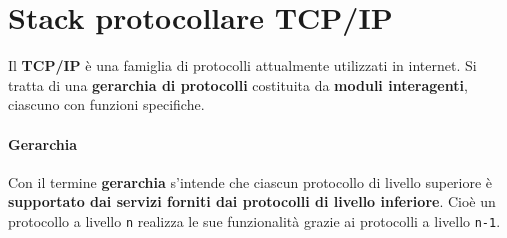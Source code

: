 \documentclass[10pt]{article}
\begin{document}
\section{Stack protocollare TCP/IP}
Il \textbf{TCP/IP} è una famiglia di protocolli attualmente utilizzati in internet. Si tratta di una \textbf{gerarchia di protocolli} costituita da \textbf{moduli interagenti}, ciascuno con funzioni specifiche.
\paragraph{Gerarchia} Con il termine \textbf{gerarchia} s'intende che ciascun protocollo di livello superiore è \textbf{supportato dai servizi forniti dai protocolli di livello inferiore}. Cioè un protocollo a livello \texttt{n} realizza le sue funzionalità grazie ai protocolli a livello \texttt{n-1}.
\end{document}

